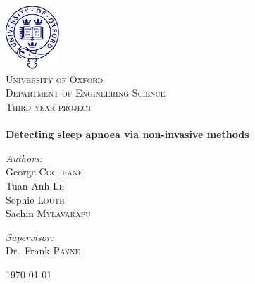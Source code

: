 \begin{titlepage}
\begin{center}

~\\[2cm]
\includegraphics[width=0.15\textwidth]{drawings/oxford.pdf}\\[1cm]

\textsc{\LARGE University of Oxford}\\
\textsc{\Large Department of Engineering Science}\\[1cm]

\textsc{\Large Third year project}\\[0.5cm]

\HRule \\[0.4cm]
{\huge \bfseries Detecting sleep apnoea via non-invasive methods}
\HRule \\[1.5cm]

\begin{minipage}{0.4\textwidth}
\begin{flushleft} \large
\emph{Authors:}\\
George \textsc{Cochrane}\\
Tuan Anh \textsc{Le}\\
Sophie \textsc{Louth}\\
Sachin \textsc{Mylavarapu}
\end{flushleft}
\end{minipage}
\begin{minipage}{0.4\textwidth}
\begin{flushright} \large
\emph{Supervisor:} \\
Dr.~Frank \textsc{Payne}
\end{flushright}
\end{minipage}

\vfill

{\large \today}

\end{center}
\end{titlepage}